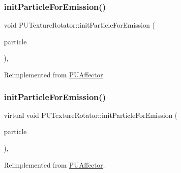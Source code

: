 \subsubsection{\texorpdfstring{init\+Particle\+For\+Emission()}{initParticleForEmission()}\hspace{0.1cm}{\footnotesize\ttfamily [1/2]}}
{\footnotesize\ttfamily void P\+U\+Texture\+Rotator\+::init\+Particle\+For\+Emission (\begin{DoxyParamCaption}\item[{\hyperlink{structPUParticle3D}{P\+U\+Particle3D} $\ast$}]{particle }\end{DoxyParamCaption})\hspace{0.3cm}{\ttfamily [override]}, {\ttfamily [virtual]}}







Reimplemented from \hyperlink{classPUAffector}{P\+U\+Affector}.

\mbox{\label{classPUTextureRotator_afec96f71b114884a9b2529c6d6eb2852}} 
\subsubsection{\texorpdfstring{init\+Particle\+For\+Emission()}{initParticleForEmission()}\hspace{0.1cm}{\footnotesize\ttfamily [2/2]}}
{\footnotesize\ttfamily virtual void P\+U\+Texture\+Rotator\+::init\+Particle\+For\+Emission (\begin{DoxyParamCaption}\item[{\hyperlink{structPUParticle3D}{P\+U\+Particle3D} $\ast$}]{particle }\end{DoxyParamCaption})\hspace{0.3cm}{\ttfamily [override]}, {\ttfamily [virtual]}}







Reimplemented from \hyperlink{classPUAffector}{P\+U\+Affector}.

\mbox{\label{classPUTextureRotator_a997bb8fc630de052732b14fdaa27943f}} 
